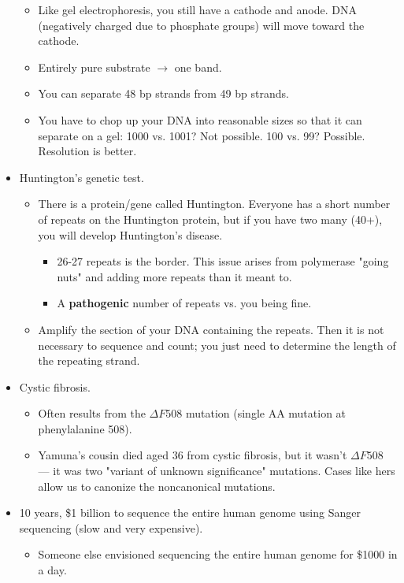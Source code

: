 \documentclass[../notes.tex]{subfiles}
\begin{document}
\begin{itemize}
\begin{itemize}
        \item Like gel electrophoresis, you still have a cathode and anode. DNA (negatively charged due to phosphate groups) will move toward the cathode.
        \item Entirely pure substrate $\to$ one band.
        \item You can separate 48 bp strands from 49 bp strands.
        \item You have to chop up your DNA into reasonable sizes so that it can separate on a gel: 1000 vs. 1001? Not possible. 100 vs. 99? Possible. Resolution is better.
    \end{itemize}
    \item Huntington's genetic test.
    \begin{itemize}
        \item There is a protein/gene called Huntington. Everyone has a short number of repeats on the Huntington protein, but if you have two many (40+), you will develop Huntington's disease.
        \begin{itemize}
            \item 26-27 repeats is the border. This issue arises from polymerase "going nuts" and adding more repeats than it meant to.
            \item A \textbf{pathogenic} number of repeats vs. you being fine.
        \end{itemize}
        \item Amplify the section of your DNA containing the repeats. Then it is not necessary to sequence and count; you just need to determine the length of the repeating strand.
    \end{itemize}
    \item Cystic fibrosis.
    \begin{itemize}
        \item Often results from the $\Delta F508$ mutation (single AA mutation at phenylalanine 508).
        \item Yamuna's cousin died aged 36 from cystic fibrosis, but it wasn't $\Delta F508$ --- it was two "variant of unknown significance" mutations. Cases like hers allow us to canonize the noncanonical mutations.
    \end{itemize}
    \item 10 years, \$1 billion to sequence the entire human genome using Sanger sequencing (slow and very expensive).
    \begin{itemize}
        \item Someone else envisioned sequencing the entire human genome for \$1000 in a day.

\end{itemize}
\end{itemize}
\end{document}
